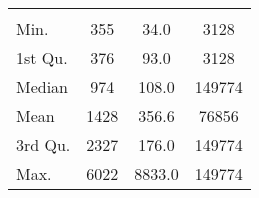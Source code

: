 \begin{tabular}{lS[table-format=5.1]S[table-format=5.1]S[table-format=5.1]}
&  &  &  \\
 Min.    & 355 & 34.0 & 3128 \\
 1st Qu. & 376 & 93.0 & 3128 \\
 Median  & 974 & 108.0 & 149774 \\
 Mean    & 1428 & 356.6 & 76856 \\
 3rd Qu. & 2327 & 176.0 & 149774 \\
 Max.    & 6022 & 8833.0 & 149774 \\
\end{tabular}
